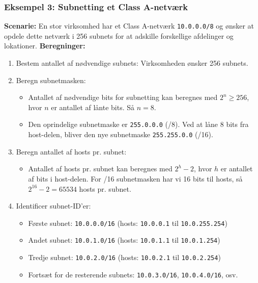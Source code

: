 \subsubsection{Eksempel 3: Subnetting et Class A-netværk}
\textbf{Scenarie:} En stor virksomhed har et Class A-netværk \texttt{10.0.0.0/8} og ønsker at opdele dette netværk i 256 subnets for at adskille forskellige afdelinger og lokationer.
\newline\newline\noindent
\textbf{Beregninger:}
\begin{enumerate}
	\item Bestem antallet af nødvendige subnets: Virksomheden ønsker 256 subnets.
	\item Beregn subnetmasken:
	\begin{itemize}
		\item Antallet af nødvendige bits for subnetting kan beregnes med \(2^n \geq 256\), hvor \(n\) er antallet af lånte bits. Så \(n = 8\).
		\item Den oprindelige subnetmaske er \texttt{255.0.0.0} (/8). Ved at låne 8 bits fra host-delen, bliver den nye subnetmaske \texttt{255.255.0.0} (/16).
	\end{itemize}
	\item Beregn antallet af hosts pr. subnet:
	\begin{itemize}
		\item Antallet af hosts pr. subnet kan beregnes med \(2^h - 2\), hvor \(h\) er antallet af bits i host-delen. For /16 subnetmasken har vi 16 bits til hosts, så \(2^{16} - 2 = 65534\) hosts pr. subnet.
	\end{itemize}
	\item Identificer subnet-ID'er:
	\begin{itemize}
		\item Første subnet: \texttt{10.0.0.0/16} (hosts: \texttt{10.0.0.1} til \texttt{10.0.255.254})
		\item Andet subnet: \texttt{10.0.1.0/16} (hosts: \texttt{10.0.1.1} til \texttt{10.0.1.254})
		\item Tredje subnet: \texttt{10.0.2.0/16} (hosts: \texttt{10.0.2.1} til \texttt{10.0.2.254})
		\item Fortsæt for de resterende subnets: \texttt{10.0.3.0/16}, \texttt{10.0.4.0/16}, osv.
	\end{itemize}
\end{enumerate}

